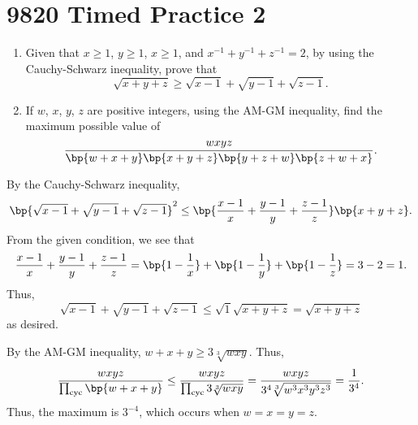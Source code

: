 \section{9820 Timed Practice 2}

\begin{problem}
    \begin{enumerate}
        \item Given that $x \geq 1$, $y \geq 1$, $x \geq 1$, and $x^{-1} + y^{-1} + z^{-1} = 2$, by using the Cauchy-Schwarz inequality, prove that \[\sqrt{x + y + z} \geq \sqrt{x-1} + \sqrt{y-1} + \sqrt{z-1}.\]
        \item If $w$, $x$, $y$, $z$ are positive integers, using the AM-GM inequality, find the maximum possible value of \[\frac{wxyz}{\bp{w + x + y} \bp{x + y + z} \bp{y + z + w} \bp{z + w + x}}.\]
    \end{enumerate}
\end{problem}
\begin{solution}
    \begin{ppart}
        By the Cauchy-Schwarz inequality, \[\bp{\sqrt{x-1} + \sqrt{y-1} + \sqrt{z-1}}^2 \leq \bp{\frac{x-1}{x} + \frac{y-1}{y} + \frac{z-1}{z}}\bp{x + y + z}.\] From the given condition, we see that \[\frac{x-1}{x} + \frac{y-1}{y} + \frac{z-1}{z} = \bp{1 - \frac1x} + \bp{1 - \frac1y} + \bp{1 - \frac1z} = 3 - 2 = 1.\] Thus, \[\sqrt{x-1} + \sqrt{y-1} + \sqrt{z-1} \leq \sqrt{1} \sqrt{x + y + z} = \sqrt{x + y + z}\] as desired.
    \end{ppart}
    \begin{ppart}
        By the AM-GM inequality, $w + x + y \geq 3 \sqrt[3]{wxy}$. Thus, \[\frac{wxyz}{\prod_{\text{cyc}} \bp{w + x + y}} \leq \frac{wxyz}{\prod_{\text{cyc}} 3\sqrt[3]{wxy}} = \frac{wxyz}{3^4 \sqrt[3]{w^3 x^3 y^3 z^3}} = \frac1{3^4}.\] Thus, the maximum is $3^{-4}$, which occurs when $w = x = y = z$.
    \end{ppart}
\end{solution}

